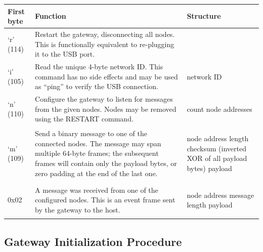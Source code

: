 {
\tabulinesep=5pt
\begin{longtabu} to 
	\toprule
	\textbf{First byte} & \textbf{Function} & \textbf{Structure} \\
	\midrule
	\endhead

	\bottomrule
	\endfoot

	`r' (114) &
	Restart the gateway, disconnecting all nodes. This is functionally equivalent to re-plugging it to the USB port.
	& \\

	`i' (105) &
	Read the unique 4-byte network ID. This command has no side effects and may be used as ``ping'' to verify the USB connection. &
	\begin{cmdresp}
		 network ID
	\end{cmdresp}
	\\

	`n' (110) &
	Configure the gateway to listen for messages from the given nodes.
	Nodes may be removed using the RESTART command.
	&
	\begin{cmdreq}
		 count
		 node addresses
	\end{cmdreq}
	\\

	`m' (109)&
	\cname{SEND\_MSG}
	Send a binary message to one of the connected nodes. The message may span multiple 64-byte frames; the subsequent frames will contain only the payload bytes, or zero padding at the end of the last one.
	& \begin{cmdreq}
		 node address
		 length
		 checksum (inverted XOR of all payload bytes)
		 payload
	\end{cmdreq} \\

	0x02 &
	A message was received from one of the configured nodes. This is an event frame sent by the gateway to the host.
	& \begin{cmdpld}
		 node address
		 message length
		 payload
	\end{cmdpld} \\

\end{longtabu}
}

\subsection{Gateway Initialization Procedure}

